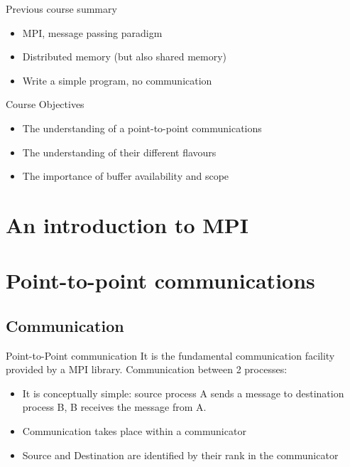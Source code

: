 \documentclass[aspectratio=43]{beamer}
\begin{document}
\cscstitle

\begin{frame}{Previous course summary}
\begin{itemize}
\item MPI, message passing paradigm
\item Distributed memory (but also shared memory)
\item Write a simple program, no communication
\end{itemize}
\end{frame}

\begin{frame}{Course Objectives}
\begin{itemize}
\item The understanding of a point-to-point communications
\item The understanding of their different flavours
\item The importance of buffer availability and scope
\end{itemize}
\end{frame}


\section{An introduction to MPI}
\section{Point-to-point communications}


\subsection{Communication}

\begin{frame}{Point-to-Point communication}
It is the fundamental communication facility provided by a MPI library.
Communication between 2 processes:
\begin{itemize}
\item It is conceptually simple: source process A sends a message to destination process B, B receives the message from A.
\item Communication takes place within a communicator
\item Source and Destination are identified by their rank in the communicator
\end{itemize}
\end{frame}
\end{document}
